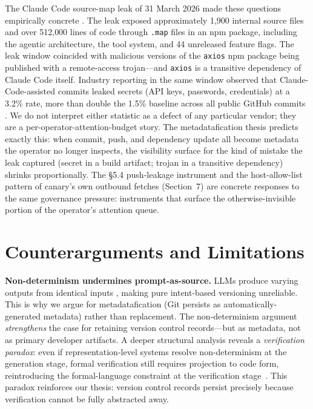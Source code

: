 \documentclass[12pt]{article}
\begin{document}
The Claude Code source-map leak of 31 March 2026 made these questions empirically concrete \citep{anthropic2026codeleak}. The leak exposed approximately 1{,}900 internal source files and over 512{,}000 lines of code through \texttt{.map} files in an npm package, including the agentic architecture, the tool system, and 44 unreleased feature flags. The leak window coincided with malicious versions of the \texttt{axios} npm package being published with a remote-access trojan---and \texttt{axios} is a transitive dependency of Claude Code itself. Industry reporting in the same window observed that Claude-Code-assisted commits leaked secrets (API keys, passwords, credentials) at a 3.2\% rate, more than double the 1.5\% baseline across all public {GitHub} commits \citep{ai2026secretleakage}. We do not interpret either statistic as a defect of any particular vendor; they are a per-operator-attention-budget story. The metadatafication thesis predicts exactly this: when commit, push, and dependency update all become metadata the operator no longer inspects, the visibility surface for the kind of mistake the leak captured (secret in a build artifact; trojan in a transitive dependency) shrinks proportionally. The §5.4 push-leakage instrument and the host-allow-list pattern of canary's own outbound fetches (Section~7) are concrete responses to the same governance pressure: instruments that surface the otherwise-invisible portion of the operator's attention queue.

\section{Counterarguments and Limitations}

\textbf{Non-determinism undermines prompt-as-source.} LLMs produce varying outputs from identical inputs \citep{hn2026provenance}, making pure intent-based versioning unreliable. This is why we argue for metadatafication (Git persists as automatically-generated metadata) rather than replacement. The non-determinism argument \textit{strengthens} the case for retaining version control records---but as metadata, not as primary developer artifacts. A deeper structural analysis reveals a \emph{verification paradox}: even if representation-level systems resolve non-determinism at the generation stage, formal verification still requires projection to code form, reintroducing the formal-language constraint at the verification stage~\citep{zgap2026chomsky}. This paradox reinforces our thesis: version control records persist precisely because verification cannot be fully abstracted away.
\end{document}
